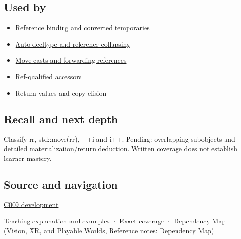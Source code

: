 \subsection{Used by}\label{appendix-1121b30eaeb0-used-by}

\hypertarget{appendix-1121b30eaeb0-used-by}{}

\begin{itemize}
\tightlist
\item
  \hyperref[appendix-37856d997bb0]{Reference binding and converted temporaries}
\item
  \hyperref[appendix-5d4252a42886]{Auto decltype and reference collapsing}
\item
  \hyperref[appendix-0104b704fb11]{Move casts and forwarding references}
\item
  \hyperref[appendix-d42039b1d6f7]{Ref-qualified accessors}
\item
  \hyperref[appendix-b08d3788c5c6]{Return values and copy elision}
\end{itemize}

\subsection{Recall and next depth}\label{appendix-1121b30eaeb0-recall-and-next-depth}

\hypertarget{appendix-1121b30eaeb0-recall-and-next-depth}{}

Classify rr, std::move(rr), ++i and i++. Pending: overlapping subobjects and detailed materialization/return deduction. Written coverage does not establish learner mastery.

\subsection{Source and navigation}\label{appendix-1121b30eaeb0-source-and-navigation}

\hypertarget{appendix-1121b30eaeb0-source-and-navigation}{}

\hyperref[appendix-fd090d982a15-m009---parts-127-147]{C009 development}

\hyperref[01-foundations-i-ch003-an-expression-has-a-type-and-a-category]{Teaching explanation and examples} · \hyperref[appendix-fd090d982a15-m008---parts-113-126]{Exact coverage} · \href{../07-Vision-XR-and-Playable-Worlds/main.pdf\#nameddest=appendix-4ad47bdd269a}{Dependency Map (Vision, XR, and Playable Worlds, Reference notes: Dependency Map)}
